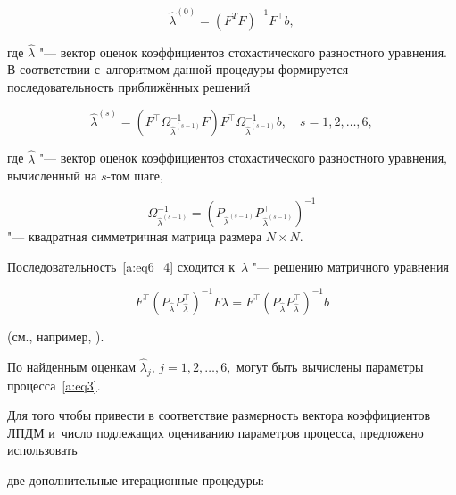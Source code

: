 \begin{equation}    \label{a:eq6_3}

\hat{\lambda}^{(0)}=(F^{T}F)^{-1}F^{\top}b,

\end{equation}

где $\hat{\lambda} $ "--- вектор оценок коэффициентов сто\-хас\-ти\-чес\-ко\-го разностного уравнения. В соответствии с~алгоритмом данной процедуры формируется по\-сле\-до\-ва\-тель\-ность приближённых решений

\begin{equation}    \label{a:eq6_4}

\hat{\lambda}^{(s)}=(F^\top \Omega_{\hat{\lambda}^{(s-1)}}^{-1}F)F^\top \Omega_{\hat{\lambda}^{(s-1)}}^{-1}b, \quad

s=1, 2, \ldots, 6,

\end{equation}

где $\hat{\lambda}$ "--- вектор оценок коэффициентов стохастического разностного уравнения, вычисленный на $s$-том шаге,

$$\Omega_{\hat{\lambda}^{(s-1)}}^{-1}=(P_{\hat{\lambda}^{(s-1)}}P_{\hat{\lambda}^{(s-1)}}^{\top}

)^{-1}$$ "--- квадратная симметричная матрица размера $N \times N$. 

Последовательность~\eqref{a:eq6_4} сходится к~$\lambda$ "--- решению матричного уравнения

$$

F^\top(P_{\hat{\lambda}}P_{\hat{\lambda}}^\top )^{-1}F\lambda= F^\top(P_{\hat{\lambda}}P_{\hat{\lambda}}^\top)^{-1}b

$$

(см., например, \cite{v:Z}).

По найденным оценкам $\hat{\lambda}_j$, $j=1, 2, \ldots, 6,$ могут быть вычислены параметры процесса~\eqref{a:eq3}.



Для того чтобы привести в соответствие размерность вектора коэффициентов ЛПДМ и~число подлежащих оцениванию параметров процесса, предложено использовать



две дополнительные итерационные процедуры:

